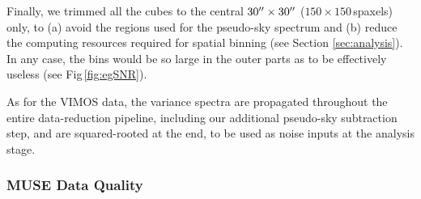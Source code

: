 		Finally, we trimmed all the cubes to the central $30\hbox{$^{\prime\prime}$} \times 30\hbox{$^{\prime\prime}$}$ ($150 \times 150$\,spaxels) only, to (a) avoid the regions used for the pseudo-sky spectrum and (b) reduce the computing resources required for spatial binning (see Section \ref{sec:analysis}). In any case, the bins would be so large in the outer parts as to be effectively useless (see Fig\,\ref{fig:egSNR}).

		As for the VIMOS data, the variance spectra are propagated throughout the entire data-reduction pipeline, including our additional pseudo-sky subtraction step, and are squared-rooted at the end, to be used as noise inputs at the analysis stage. 

		\subsubsection{MUSE Data Quality}

